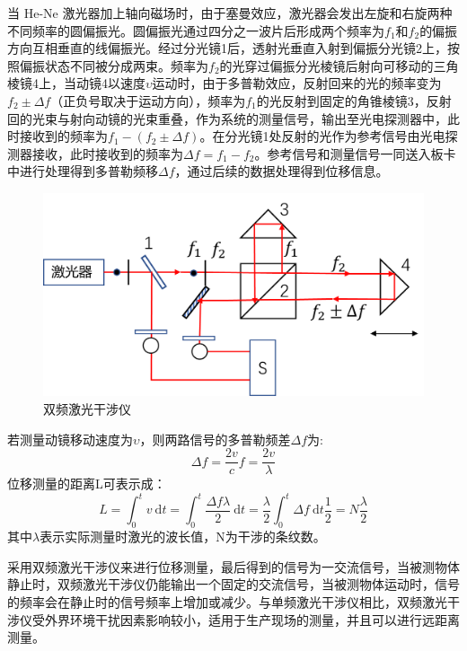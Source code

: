 \documentclass[type=master,oneside]{fduthesis}
\begin{document}
当 He-Ne 激光器加上轴向磁场时，由于塞曼效应，激光器会发出左旋和右旋两种不同频率的圆偏振光。圆偏振光通过四分之一波片后形成两个频率为$f_{1}$和$f_{2}$的偏振方向互相垂直的线偏振光。经过分光镜1后，透射光垂直入射到偏振分光镜2上，按照偏振状态不同被分成两束。频率为$f_{2}$的光穿过偏振分光棱镜后射向可移动的三角棱镜4上，当动镜4以速度$\upsilon $运动时，由于多普勒效应，反射回来的光的频率变为$f_{2} \pm \Delta f$（正负号取决于运动方向），频率为$f_{1}$的光反射到固定的角锥棱镜3，反射回的光束与射向动镜的光束重叠，作为系统的测量信号，输出至光电探测器中，此时接收到的频率为$f_{1}-\left(f_{2} \pm \Delta f\right)$。在分光镜1处反射的光作为参考信号由光电探测器接收，此时接收到的频率为$\Delta f = f_{1}-f_{2}$。参考信号和测量信号一同送入板卡中进行处理得到多普勒频移$\Delta f$，通过后续的数据处理得到位移信息。
\begin{figure}[H]
  \centering
  \includegraphics[width=1\textwidth]{5-fig/双频激光干涉仪.png}
  \caption{双频激光干涉仪}
  \label{fig:双频激光干涉仪原理图}
\end{figure}
若测量动镜移动速度为$ \upsilon $，则两路信号的多普勒频差$\Delta f$为:
\begin{equation}
  \Delta f=\frac{2 v}{c} f=\frac{2 v}{\lambda}
\end{equation}
位移测量的距离L可表示成：
\begin{equation}
  L=\int_{0}^{t} v \mathrm{~d} t=\int_{0}^{t} \frac{\Delta f \lambda}{2} \mathrm{~d} t=\frac{\lambda}{2} \int_{0}^{t} \Delta f \mathrm{~d} t \frac{1}{2}=N \frac{\lambda}{2}
\end{equation}
其中$\lambda$表示实际测量时激光的波长值，N为干涉的条纹数。

采用双频激光干涉仪来进行位移测量，最后得到的信号为一交流信号，当被测物体静止时，双频激光干涉仪仍能输出一个固定的交流信号，当被测物体运动时，信号的频率会在静止时的信号频率上增加或减少。与单频激光干涉仪相比，双频激光干涉仪受外界环境干扰因素影响较小，适用于生产现场的测量，并且可以进行远距离测量。
\end{document}
